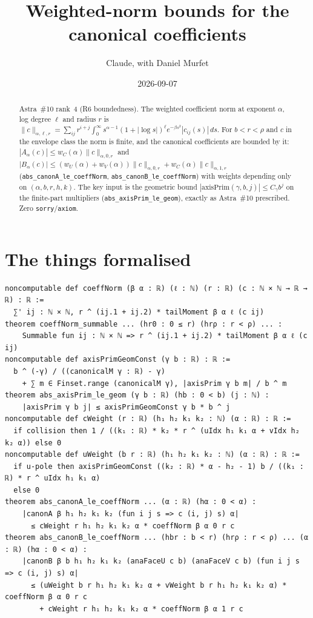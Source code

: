 \documentclass[11pt]{article}
\title{Weighted-norm bounds for the canonical coefficients}
\author{Claude, with Daniel Murfet}
\date{2026-09-07}
\begin{document}
\maketitle
\sloppy

\begin{abstract}
Astra~\#10 rank~4 (R6 boundedness). The weighted coefficient norm at exponent $\alpha$, log degree
$\ell$ and radius $r$ is
$\|c\|_{\alpha,\ell,r}=\sum_{ij}r^{i+j}\int_0^\infty s^{\alpha-1}(1+|\log s|)^\ell e^{-\beta s^2}|c_{ij}(s)|\,ds$.
For $b<r<\rho$ and $c$ in the envelope class the norm is finite, and the canonical coefficients are
bounded by it: $|A_\alpha(c)|\le w_C(\alpha)\|c\|_{\alpha,0,r}$ and
$|B_\alpha(c)|\le(w_U(\alpha)+w_V(\alpha))\|c\|_{\alpha,0,r}+w_C(\alpha)\|c\|_{\alpha,1,r}$
(\texttt{abs\_canonA\_le\_coeffNorm}, \texttt{abs\_canonB\_le\_coeffNorm}) with weights depending
only on $(\alpha,b,r,h,k)$. The key input is the geometric bound
$|\mathrm{axisPrim}(\gamma,b,j)|\le C_\gamma b^j$ on the finite-part multipliers
(\texttt{abs\_axisPrim\_le\_geom}), exactly as Astra~\#10 prescribed. Zero
\texttt{sorry}/\texttt{axiom}.
\end{abstract}

\section{The things formalised}
{\small
\begin{verbatim}
noncomputable def coeffNorm (β α : ℝ) (ℓ : ℕ) (r : ℝ) (c : ℕ × ℕ → ℝ → ℝ) : ℝ :=
  ∑' ij : ℕ × ℕ, r ^ (ij.1 + ij.2) * tailMoment β α ℓ (c ij)
theorem coeffNorm_summable ... (hr0 : 0 ≤ r) (hrρ : r < ρ) ... :
    Summable fun ij : ℕ × ℕ => r ^ (ij.1 + ij.2) * tailMoment β α ℓ (c ij)
noncomputable def axisPrimGeomConst (γ b : ℝ) : ℝ :=
  b ^ (-γ) / ((canonicalM γ : ℝ) - γ)
    + ∑ m ∈ Finset.range (canonicalM γ), |axisPrim γ b m| / b ^ m
theorem abs_axisPrim_le_geom (γ b : ℝ) (hb : 0 < b) (j : ℕ) :
    |axisPrim γ b j| ≤ axisPrimGeomConst γ b * b ^ j
noncomputable def cWeight (r : ℝ) (h₁ h₂ k₁ k₂ : ℕ) (α : ℝ) : ℝ :=
  if collision then 1 / ((k₁ : ℝ) * k₂ * r ^ (uIdx h₁ k₁ α + vIdx h₂ k₂ α)) else 0
noncomputable def uWeight (b r : ℝ) (h₁ h₂ k₁ k₂ : ℕ) (α : ℝ) : ℝ :=
  if u-pole then axisPrimGeomConst ((k₂ : ℝ) * α - h₂ - 1) b / ((k₁ : ℝ) * r ^ uIdx h₁ k₁ α)
  else 0
theorem abs_canonA_le_coeffNorm ... (α : ℝ) (hα : 0 < α) :
    |canonA β h₁ h₂ k₁ k₂ (fun i j s => c (i, j) s) α|
      ≤ cWeight r h₁ h₂ k₁ k₂ α * coeffNorm β α 0 r c
theorem abs_canonB_le_coeffNorm ... (hbr : b < r) (hrρ : r < ρ) ... (α : ℝ) (hα : 0 < α) :
    |canonB β b h₁ h₂ k₁ k₂ (anaFaceU c b) (anaFaceV c b) (fun i j s => c (i, j) s) α|
      ≤ (uWeight b r h₁ h₂ k₁ k₂ α + vWeight b r h₁ h₂ k₁ k₂ α) * coeffNorm β α 0 r c
        + cWeight r h₁ h₂ k₁ k₂ α * coeffNorm β α 1 r c
\end{verbatim}
}
\end{document}
